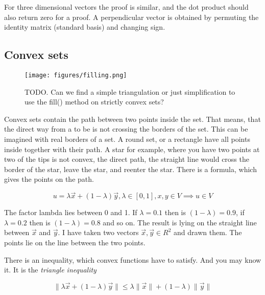 \documentclass[a4paper]{article}
\begin{document}
For three dimensional vectors the proof is similar, and the dot product should also return zero for a proof. A perpendicular vector is obtained by permuting the identity matrix (standard basis) and changing sign.





\subsection{Convex sets}

\begin{flushleft}
\begin{figure}[ht]

\texttt{[image: figures/filling.png]}
\caption{TODO. Can we find a simple triangulation or just simplification to use the fill() method on strictly convex sets?}

\end{figure}
\end{flushleft}


Convex sets contain the path between two points inside the set. That means, that the direct way from a to be is not crossing the borders of the set. This can be imagined with real borders of a set. A round set, or a rectangle have all points inside together with their path. A star for example, where you have two points at two of the tips is not convex, the direct path, the straight line would cross the border of the star, leave the star, and reenter the star. There is a formula, which gives the points on the path.

\begin{displaymath}
u = \lambda\vec{x} + (1-\lambda)\vec{y}, \lambda \in [0,1], x,y \in V \implies u \in V
\end{displaymath}

The factor lambda lies between 0 and 1. If $\lambda = 0.1$ then is $(1-\lambda) = 0.9$, if $\lambda = 0.2$ then is $(1-\lambda) = 0.8$ and so on. The result is lying on the straight line between $\vec{x}$ and $\vec{y}$. I have taken two vectors $\vec{x}, \vec{y} \in R^2$ and drawn them. The points lie on the line between the two points.

There is an inequality, which convex functions have to satisfy. And you may know it. It is the \emph{triangle inequality}

\begin{displaymath}
\|\lambda\vec{x} + (1-\lambda)\vec{y}\| \leq \lambda\|\vec{x}\| + (1-\lambda)\|\vec{y}\|
\end{displaymath}
\end{document}
